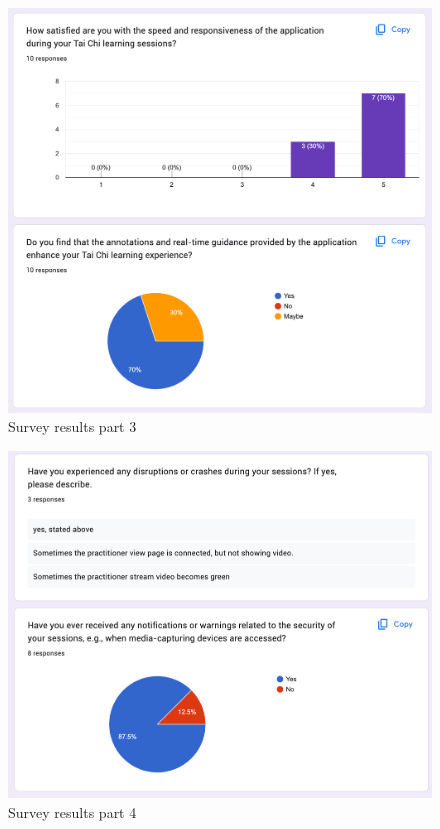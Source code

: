 \documentclass[12pt, titlepage]{article}
\begin{document}
\begin{figure}[h]
  \centering
  \includegraphics[width=1.0\linewidth]{surveyp3.png}
  \caption{Survey results part 3}
  \label{fig:surveyp3}
\end{figure}

\begin{figure}[h]
  \centering
  \includegraphics[width=1.0\linewidth]{surveyp4.png}
  \caption{Survey results part 4}
  \label{fig:surveyp4}
\end{figure}
\end{document}
